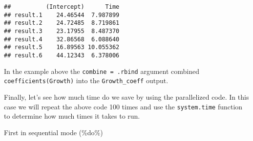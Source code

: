 \documentclass[]{article}
\newenvironment{Shaded}{\begin{snugshade}}{\end{snugshade}}
\newcommand{\KeywordTok}[1]{\textcolor[rgb]{0.13,0.29,0.53}{\textbf{#1}}}
\newcommand{\DataTypeTok}[1]{\textcolor[rgb]{0.13,0.29,0.53}{#1}}
\newcommand{\DecValTok}[1]{\textcolor[rgb]{0.00,0.00,0.81}{#1}}
\newcommand{\StringTok}[1]{\textcolor[rgb]{0.31,0.60,0.02}{#1}}
\newcommand{\CommentTok}[1]{\textcolor[rgb]{0.56,0.35,0.01}{\textit{#1}}}
\newcommand{\OperatorTok}[1]{\textcolor[rgb]{0.81,0.36,0.00}{\textbf{#1}}}
\newcommand{\NormalTok}[1]{#1}
\begin{document}
\begin{Shaded}
\end{Shaded}

\begin{verbatim}
##          (Intercept)      Time
## result.1    24.46544  7.987899
## result.2    24.72485  8.719861
## result.3    23.17955  8.487370
## result.4    32.86568  6.088640
## result.5    16.89563 10.055362
## result.6    44.12343  6.378006
\end{verbatim}

In the example above the \texttt{combine\ =\ .rbind} argument combined
\texttt{coefficients(Growth)} into the \texttt{Growth\_coeff} output.

Finally, let's see how much time do we save by using the parallelized
code. In this case we will repeat the above code 100 times and use the
\texttt{system.time} function to determine how much times it takes to
run.

First in sequential mode (\%do\%)
\end{document}

